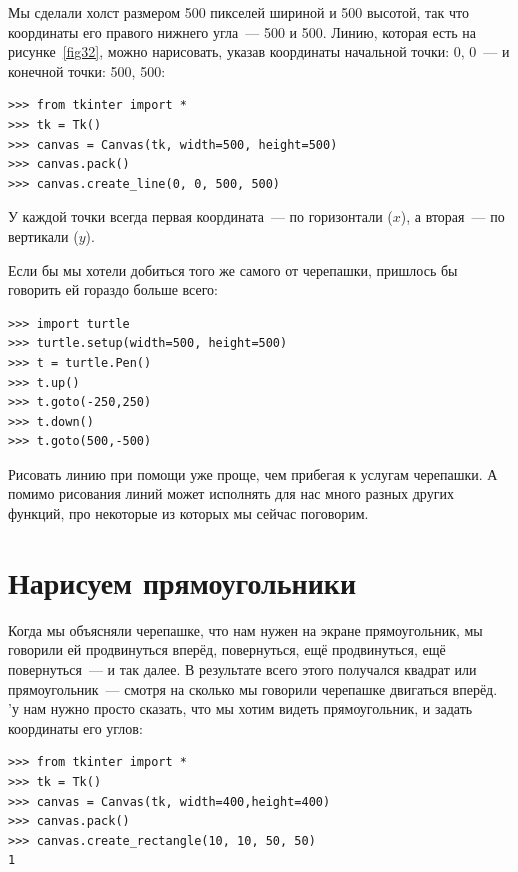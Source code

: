 Мы сделали холст размером 500 пикселей шириной и 500 высотой, так что координаты его правого нижнего угла — 500 и 500. Линию, которая есть на рисунке \ref{fig32}, можно нарисовать, указав координаты начальной точки: 0, 0 — и конечной точки: 500, 500:

\begin{listing}
\begin{verbatim}
>>> from tkinter import *
>>> tk = Tk()
>>> canvas = Canvas(tk, width=500, height=500)
>>> canvas.pack()
>>> canvas.create_line(0, 0, 500, 500)
\end{verbatim}
\end{listing}

У каждой точки всегда первая координата — по горизонтали ($x$), а вторая — по вертикали ($y$).

Если бы мы хотели добиться того же самого от черепашки, пришлось бы говорить ей гораздо больше всего:

\begin{listing}
\begin{verbatim}
>>> import turtle
>>> turtle.setup(width=500, height=500)
>>> t = turtle.Pen()
>>> t.up()
>>> t.goto(-250,250)
>>> t.down()
>>> t.goto(500,-500)
\end{verbatim}
\end{listing}

Рисовать линию при помощи  уже проще, чем прибегая к услугам черепашки. А помимо рисования линий  может исполнять для нас много разных других функций, про некоторые из которых мы сейчас поговорим.

\section{Нарисуем прямоугольники}

Когда мы объясняли черепашке, что нам нужен на экране прямоугольник, мы говорили ей продвинуться вперёд, повернуться, ещё продвинуться, ещё повернуться — и так далее. В результате всего этого получался квадрат или прямоугольник — смотря на сколько мы говорили черепашке двигаться вперёд. 'у нам нужно просто сказать, что мы хотим видеть прямоугольник, и задать координаты его углов:

\begin{listing}
\begin{verbatim}
>>> from tkinter import *
>>> tk = Tk()
>>> canvas = Canvas(tk, width=400,height=400)
>>> canvas.pack()
>>> canvas.create_rectangle(10, 10, 50, 50)
1
\end{verbatim}
\end{listing}

